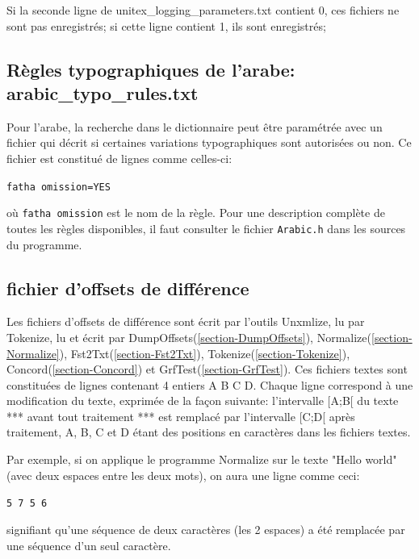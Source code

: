 Si la seconde ligne de unitex\_logging\_parameters.txt contient 0, ces fichiers ne sont pas
enregistrés; si cette ligne contient 1, ils sont enregistrés;

\subsection{Règles typographiques de l'arabe: arabic\_typo\_rules.txt}
\label{subsection-arabic-typo-rules}
Pour l'arabe, la recherche dans le dictionnaire peut être paramétrée avec un fichier qui décrit si
certaines variations typographiques sont autorisées ou non. Ce fichier est constitué de lignes comme
celles-ci:

\bigskip
\noindent \verb+fatha omission=YES+

\bigskip
\noindent où \verb+fatha omission+ est le nom de la règle. Pour une description complète de toutes
les règles disponibles, il faut consulter le fichier \verb+Arabic.h+ dans les sources du programme.

\subsection{fichier d'offsets de différence}
\label{subsection-offsets-diff}

Les fichiers d'offsets de différence sont écrit par l'outils Unxmlize, lu par Tokenize, lu et écrit par
DumpOffsets(\ref{section-DumpOffsets}), Normalize(\ref{section-Normalize}), Fst2Txt(\ref{section-Fst2Txt}), Tokenize(\ref{section-Tokenize}), Concord(\ref{section-Concord}) et GrfTest(\ref{section-GrfTest}).
\bigskip
Ces fichiers textes sont constituées de lignes contenant 4 entiers A B C D. Chaque ligne correspond à une modification du texte, exprimée de la façon suivante:
\bigskip
l'intervalle [A;B[ du texte *** avant tout traitement *** est remplacé par l'intervalle [C;D[ après traitement, A, B, C et D étant des positions en caractères dans les fichiers textes.
\bigskip

Par exemple, si on applique le programme Normalize sur le texte "Hello  world" (avec deux espaces entre les deux mots), on aura une ligne comme ceci:

\bigskip
\noindent \verb+5 7 5 6+
\bigskip

signifiant qu'une séquence de deux caractères (les 2 espaces) a été remplacée par une séquence d'un seul caractère.

\bigskip

